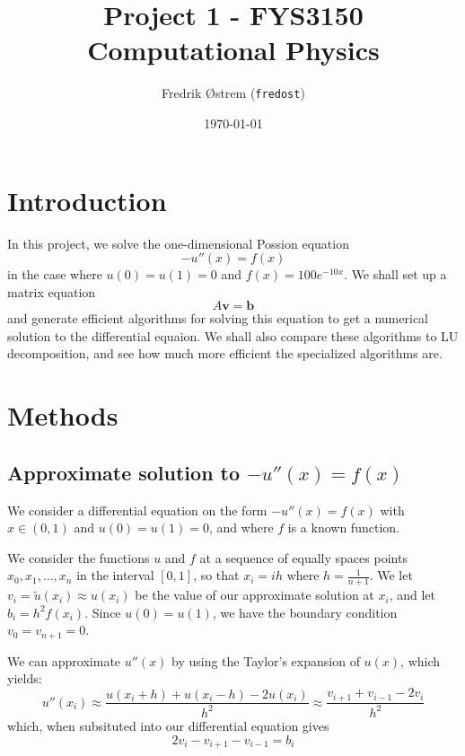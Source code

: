 \documentclass[12pt,a4paper]{article}
\newcommand\V[1]{\mathbf{#1}}                  %
\begin{document}
\title{Project 1 - FYS3150 Computational Physics}
\author{Fredrik Østrem (\texttt{fredost})}
\date{\today}

\maketitle

\tableofcontents

\clearpage

\section{Introduction}

In this project, we solve the one-dimensional Possion equation
\begin{equation}
  - u''(x) = f(x)
\end{equation}
in the case where $u(0) = u(1) = 0$ and $f(x) = 100e^{-10x}$. We shall set up a matrix equation
\begin{equation}
  A \V{v} = \V{b}
\end{equation}
and generate efficient algorithms for solving this equation to get a numerical solution to the differential equaion. We shall also compare these algorithms to LU decomposition, and see how much more efficient the specialized algorithms are.

\section{Methods}

\subsection{Approximate solution to $-u''(x) = f(x)$}

We consider a differential equation on the form $-u''(x) = f(x)$ with $x \in (0,1)$ and $u(0) = u(1) = 0$, and where $f$ is a known function.

We consider the functions $u$ and $f$ at a sequence of equally spaces points $x_0,x_1,\ldots,x_n$ in the interval $[0,1]$, so that $x_i = ih$ where $h = \frac{1}{n+1}$. We let $v_i = \tilde{u}(x_i) \approx u(x_i)$ be the value of our approximate solution at $x_i$, and let $b_i = h^2 f(x_i)$. Since $u(0) = u(1)$, we have the boundary condition $v_0 = v_{n+1} = 0$.

We can approximate $u''(x)$ by using the Taylor's expansion of $u(x)$, which yields:
\begin{equation}
  u''(x_i) \approx \frac{u(x_i+h) + u(x_i-h) - 2 u(x_i)}{h^2} \approx \frac{v_{i+1} + v_{i-1} - 2 v_i}{h^2}
\end{equation}
which, when subsituted into our differential equation gives
\begin{equation}
  2v_i - v_{i+1} - v_{i-1} = b_i
\end{equation}
\end{document}
